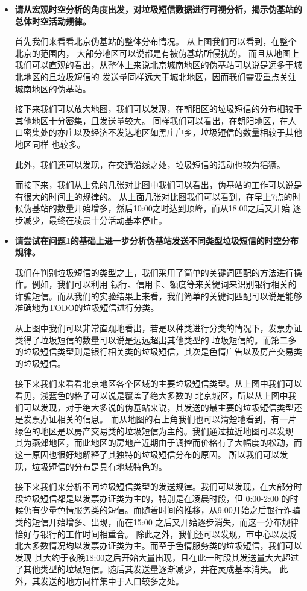 \documentclass[12pt,a4paper]{article}
\begin{document}
\begin{itemize}
	\item \textbf{请从宏观时空分析的角度出发，对垃圾短信数据进行可视分析，揭示伪基站的总体时空活动规律。}
	
	首先我们来看看北京伪基站的整体分布情况。
	从上图我们可以看到，在整个北京的范围内，
	大部分地区可以说都是有被伪基站所侵扰的。
	而且从地图上我们可以直观的看出，从整体上来说北京城南地区的伪基站可以说是远多于城北地区的且垃圾短信的
	发送量同样远大于城北地区，因而我们需要重点关注
	城南地区的伪基站。

	接下来我们可以放大地图，我们可以发现，在朝阳区的垃圾短信的分布相较于其他地区十分密集，且发送量较大。
	同样我们可以看出，在朝阳地区，在人口密集处的亦庄以及经济不发达地区如黑庄户乡，垃圾短信的数量相较于其他地区同样
	也较多。

	此外，我们还可以发现，在交通沿线之处，垃圾短信的活动也较为猖獗。

	而接下来，我们从上免的几张对比图中我们可以看出，伪基站的工作可以说是有很大的时间上的规律的。
	从上面几张对比图我们可以看到，在早上7点的时候伪基站的数量开始增多，然后10:00之时达到顶峰，而从18:00之后又开始
	逐步减少，最终在凌晨十分活动基本停止。


	\item \textbf{请尝试在问题1的基础上进一步分析伪基站发送不同类型垃圾短信的时空分布规律。}

	我们在判别垃圾短信的类型之上，我们采用了简单的关键词匹配的方法进行操作。例如，我们可以利用
	银行、信用卡、额度等来关键词来识别银行相关的诈骗短信。而从我们的实验结果上来看，我们简单的关键词匹配可以说是能够
	准确地为TODO的垃圾短信进行分类。

	从上图中我们可以非常直观地看出，若是以种类进行分类的情况下，发票办证类得了垃圾短信的数量可以说是远远超出其他类型的
	垃圾短信的。而第二多的垃圾短信类型则是银行相关类的垃圾短信，其次是色情广告以及房产交易类的垃圾短信。

	接下来我们来看看北京地区各个区域的主要垃圾短信类型。从上图中我们可以看见，浅蓝色的格子可以说是覆盖了绝大多数的
	北京城区，所以从上图中我们可以发现，对于绝大多说的伪基站来说，其发送的最主要的垃圾短信类型还是发票办证相关的信息。
	而从地图的右上角我们也可以清楚地看到，有一片绿色的地区是以房产交易类的垃圾短信为主的。我们通过拉近地图可以发现
	其为燕郊地区，而此地区的房地产近期由于调控而价格有了大幅度的松动，而这一原因也很好地解释了其独特的垃圾短信分布的原因。
	所以我们可以发现，垃圾短信的分布是具有地域特色的。

	接下来我们来分析不同垃圾短信类型的发送规律。我们可以发现，在大部分时段垃圾短信都是以发票办证类为主的，特别是在凌晨时段，但
	0:00-2:00 的时候仍有少量色情服务类的短信。而随着时间的推移，从9:00开始之后银行诈骗类的短信开始增多、出现，而在15:00
	之后又开始逐步消失，而这一分布规律恰好与银行的工作时间相重合。
	除此之外，我们还可以发现，市中心以及城北大多数情况均以发票办证类为主。而至于色情服务类的垃圾短信，我们可以发现
	其大约于夜晚18:00之后开始大量出现，且在此一时段其发送量大大超过了其他类型的垃圾短信。随后其发送量逐渐减少，并在灵成基本消失。
	此外，其发送的地方同样集中于人口较多之处。



\end{itemize}
\end{document}
